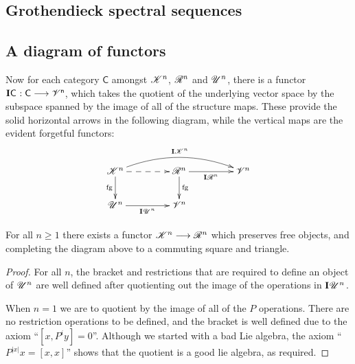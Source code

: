 \documentclass[11pt]{article}
\newcommand{\GS}[1]{\scrE^{#1}}
\newcommand{\PRLie}[1]{\scrR^{#1}}%
\newcommand{\LL}[1]{{\scrK}^{#1}}%
\newcommand{\GR}[1]{\scrV^{#1}}%
\newcommand{\nontop}[1]{\scrU^{#1}}%
\newcommand{\Ind}[2][]{\mathbf{I}{#2}_{#1}}%
\newcommand{\forget}{\mathrm{fg}}
\begin{document}
\begin{DiagramOfFunctors}
\section{Grothendieck spectral sequences}
\subsection{A diagram of functors}
Now for each category $\mathsf{C}$ amongst $\LL{n}$, $\PRLie{n}$ and $\nontop{n}$, there is a functor $\Ind{\mathsf{C}}:\mathsf{C\overset{}{\to}\GR{n}}$, which takes the quotient of the underlying vector space by the subspace spanned by the image of all of the structure maps. These provide the solid horizontal arrows in the following diagram, while the vertical maps are the evident forgetful functors: %
\[\xymatrix@R=8mm@C=15mm@!C{
\LL{n}
\ar@/^1.5em/[rr]^-{\Ind{\LL{n}}}
\ar[d]_-{\forget}
\ar@{-->}[r]_-{}%
&%
\PRLie{n}
\ar[d]^-{\forget}
\ar[r]_-{\Ind{\PRLie{n}}}
&%
\GR{n}
\\%
\nontop{n}
\ar[r]_-{\Ind{\nontop{n}}}
&%
\GR{n}
&%
}\]
\begin{prop*}
For all $n\geq1$ there exists a functor $\LL{n}\to\PRLie{n}$ which preserves free objects, and completing the diagram above to a commuting square and triangle.
\end{prop*}
\begin{proof}
For all $n$, the bracket and restrictions that are required to define an object of $\nontop{n}$ are well defined after quotienting out the image of the operations in $\Ind{\nontop{n}}$.

When $n=1$ we are to quotient by the image of all of the $P$ operations. There are no restriction operations to be defined, and the bracket is well defined due to the axiom ``$[x,P^iy]=0$''. Although we started with a bad Lie algebra, the axiom ``$P^{|x|}x=[x,x]$'' shows that the quotient is a good lie algebra, as required.


\end{proof}
\end{DiagramOfFunctors}
\end{document}

